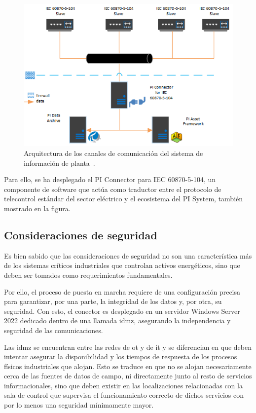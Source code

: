 \begin{figure}
  \centering
  \includegraphics[width=0.5\linewidth]{figures/sistema-de-informacion-de-planta.png}
  \caption[Arquitectura del sistema de información de planta.]{Arquitectura de los canales de comunicación del sistema de información de planta~\cite{aveva2025aveva}.}%
  \label{fig:sistema-de-informacion-de-planta}
\end{figure}

Para ello, se ha desplegado el PI Connector para IEC 60870{-}5{-}104, un componente de software que actúa como traductor entre el protocolo de telecontrol estándar del sector eléctrico y el ecosistema del PI System, también mostrado en la figura.

\subsection{Consideraciones de seguridad}%
\label{makereference3.4.2}

Es bien sabido que las consideraciones de seguridad no son una característica más de los sistemas críticos industriales que controlan activos energéticos, sino que deben ser tomados como requerimientos fundamentales.

Por ello, el proceso de puesta en marcha requiere de una configuración precisa para garantizar, por una parte, la integridad de los datos y, por otra, su seguridad. Con esto, el conector es desplegado en un servidor Windows Server 2022 dedicado dentro de una llamada \gls{idmz}, asegurando la independencia y seguridad de las comunicaciones.

Las \gls{idmz} se encuentran entre las redes de \gls{ot} y de \gls{it} y se diferencian en que deben intentar asegurar la disponibilidad y los tiempos de respuesta de los procesos físicos industriales que alojan. Esto se traduce en que no se alojan necesariamente cerca de las fuentes de datos de campo, ni directamente junto al resto de servicios informacionales, sino que deben existir en las localizaciones relacionadas con la sala de control que supervisa el funcionamiento correcto de dichos servicios con por lo menos una seguridad mínimamente mayor.

